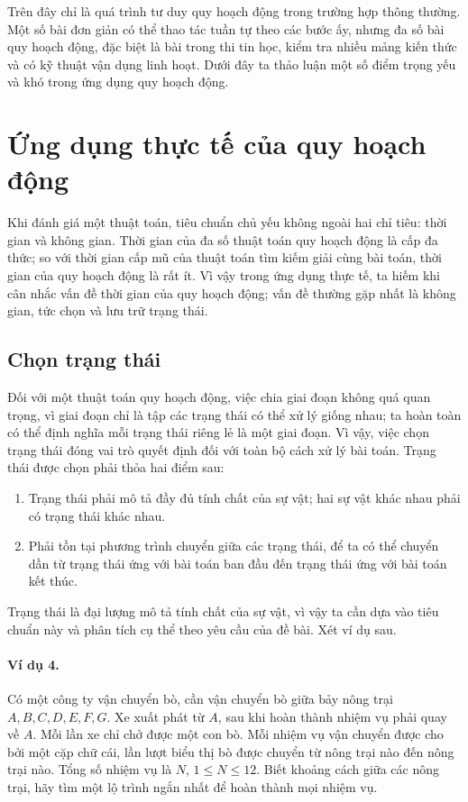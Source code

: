 \documentclass[11pt]{article}
\begin{document}
Trên đây chỉ là quá trình tư duy quy hoạch động trong trường hợp thông
thường. Một số bài đơn giản có thể thao tác tuần tự theo các bước ấy, nhưng
đa số bài quy hoạch động, đặc biệt là bài trong thi tin học, kiểm tra nhiều
mảng kiến thức và có kỹ thuật vận dụng linh hoạt. Dưới đây ta thảo luận một
số điểm trọng yếu và khó trong ứng dụng quy hoạch động.

\section{Ứng dụng thực tế của quy hoạch động}

Khi đánh giá một thuật toán, tiêu chuẩn chủ yếu không ngoài hai chỉ tiêu: thời
gian và không gian. Thời gian của đa số thuật toán quy hoạch động là cấp đa
thức; so với thời gian cấp mũ của thuật toán tìm kiếm giải cùng bài toán,
thời gian của quy hoạch động là rất ít. Vì vậy trong ứng dụng thực tế, ta
hiếm khi cân nhắc vấn đề thời gian của quy hoạch động; vấn đề thường gặp nhất
là không gian, tức chọn và lưu trữ trạng thái.

\subsection{Chọn trạng thái}

Đối với một thuật toán quy hoạch động, việc chia giai đoạn không quá quan
trọng, vì giai đoạn chỉ là tập các trạng thái có thể xử lý giống nhau; ta hoàn
toàn có thể định nghĩa mỗi trạng thái riêng lẻ là một giai đoạn. Vì vậy, việc
chọn trạng thái đóng vai trò quyết định đối với toàn bộ cách xử lý bài toán.
Trạng thái được chọn phải thỏa hai điểm sau:
\begin{enumerate}
  \item Trạng thái phải mô tả đầy đủ tính chất của sự vật; hai sự vật khác
  nhau phải có trạng thái khác nhau.
  \item Phải tồn tại phương trình chuyển giữa các trạng thái, để ta có thể
  chuyển dần từ trạng thái ứng với bài toán ban đầu đến trạng thái ứng với
  bài toán kết thúc.
\end{enumerate}

Trạng thái là đại lượng mô tả tính chất của sự vật, vì vậy ta cần dựa vào
tiêu chuẩn này và phân tích cụ thể theo yêu cầu của đề bài. Xét ví dụ sau.

\paragraph{Ví dụ 4.}
Có một công ty vận chuyển bò, cần vận chuyển bò giữa bảy nông trại
\(A,B,C,D,E,F,G\). Xe xuất phát từ \(A\), sau khi hoàn thành nhiệm vụ phải
quay về \(A\). Mỗi lần xe chỉ chở được một con bò. Mỗi nhiệm vụ vận chuyển
được cho bởi một cặp chữ cái, lần lượt biểu thị bò được chuyển từ nông trại
nào đến nông trại nào. Tổng số nhiệm vụ là \(N\), \(1\le N\le 12\). Biết
khoảng cách giữa các nông trại, hãy tìm một lộ trình ngắn nhất để hoàn thành
mọi nhiệm vụ.
\end{document}
